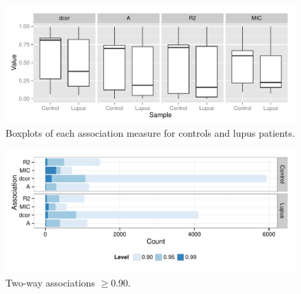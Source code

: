 \documentclass[a4paper, 12pt]{report}
\begin{document}
\begin{figure}[h]
\begin{centering}
\includegraphics[width=\textwidth]{bigBox.pdf}
\caption{Boxplots of each association measure for controls and lupus patients.} 
\label{F:bigBox}
\end{centering}
\end{figure}




\begin{figure}[h]
\begin{centering}
\includegraphics[width=\textwidth]{bigBar.pdf}
\caption{Two-way associations $\ge 0.90$.} 
\label{F:bigLevels}
\end{centering}
\end{figure}
\end{document}
